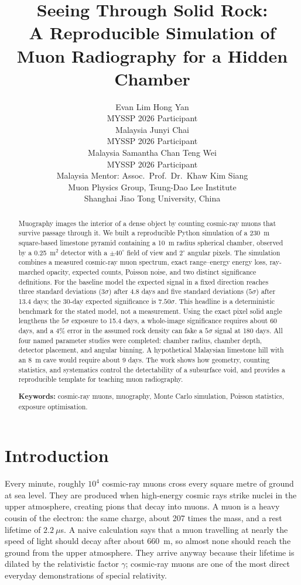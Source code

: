 \documentclass{article}
\title{Seeing Through Solid Rock:\\
       A Reproducible Simulation of Muon Radiography for a Hidden Chamber}
\author{%
  Evan Lim Hong Yan \\
  MYSSP 2026 Participant \\
  Malaysia
  \And
  Junyi Chai \\
  MYSSP 2026 Participant \\
  Malaysia
  \And
  Samantha Chan Teng Wei \\
  MYSSP 2026 Participant \\
  Malaysia
  \AND
  Mentor: Assoc.\ Prof.\ Dr.\ Khaw Kim Siang \\
  Muon Physics Group, Tsung-Dao Lee Institute \\
  Shanghai Jiao Tong University, China
}
\begin{document}
\maketitle

\begin{abstract}
Muography images the interior of a dense object by counting cosmic-ray muons
that survive passage through it. We built a reproducible Python simulation of a
230~m square-based limestone pyramid containing a 10~m radius spherical
chamber, observed by a 0.25~m$^2$ detector with a $\pm40^\circ$ field of view
and $2^\circ$ angular pixels. The simulation combines a measured cosmic-ray
muon spectrum, exact range--energy energy loss, ray-marched opacity, expected
counts, Poisson noise, and two distinct significance definitions. For the
baseline model the expected signal in a fixed direction reaches three standard
deviations ($3\sigma$) after 4.8 days and five standard deviations
($5\sigma$) after 13.4 days; the 30-day expected significance is
$7.50\sigma$. This headline is a deterministic benchmark for the stated model,
not a measurement. Using the exact pixel solid angle lengthens the $5\sigma$
exposure to 15.4 days, a whole-image significance requires about 60 days, and a
4\% error in the assumed rock density can fake a $5\sigma$ signal at 180 days.
All four named parameter studies were completed: chamber radius, chamber
depth, detector placement, and angular binning. A hypothetical Malaysian
limestone hill with an 8~m cave would require about 9 days. The work shows how
geometry, counting statistics, and systematics control the detectability of a
subsurface void, and provides a reproducible template for teaching muon
radiography.

\textbf{Keywords:} cosmic-ray muons, muography, Monte Carlo simulation,
Poisson statistics, exposure optimisation.
\end{abstract}

\section{Introduction}

Every minute, roughly $10^4$ cosmic-ray muons cross every square metre of
ground at sea level. They are produced when high-energy cosmic rays strike
nuclei in the upper atmosphere, creating pions that decay into muons. A muon is
a heavy cousin of the electron: the same charge, about 207 times the mass, and
a rest lifetime of $2.2~\mu$s. A naive calculation says that a muon travelling
at nearly the speed of light should decay after about 660~m, so almost none
should reach the ground from the upper atmosphere. They arrive anyway because
their lifetime is dilated by the relativistic factor $\gamma$; cosmic-ray muons
are one of the most direct everyday demonstrations of special relativity.
\end{document}
